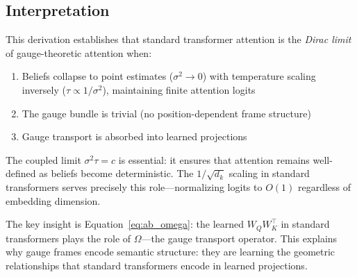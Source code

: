 \documentclass[twoside,11pt]{article}
\begin{document}
\subsection{Interpretation}

This derivation establishes that standard transformer attention is the \emph{Dirac limit} of gauge-theoretic attention when:
\begin{enumerate}
    \item Beliefs collapse to point estimates ($\sigma^2 \to 0$) with temperature scaling inversely ($\tau \propto 1/\sigma^2$), maintaining finite attention logits
    \item The gauge bundle is trivial (no position-dependent frame structure)
    \item Gauge transport is absorbed into learned projections
\end{enumerate}

The coupled limit $\sigma^2 \tau = c$ is essential: it ensures that attention remains well-defined as beliefs become deterministic. The $1/\sqrt{d_k}$ scaling in standard transformers serves precisely this role---normalizing logits to $O(1)$ regardless of embedding dimension.

The key insight is Equation~\eqref{eq:ab_omega}: the learned $W_Q W_K^\top$ in standard transformers plays the role of $\Omega$---the gauge transport operator. This explains why gauge frames encode semantic structure: they are learning the geometric relationships that standard transformers encode in learned projections.



\end{document}
